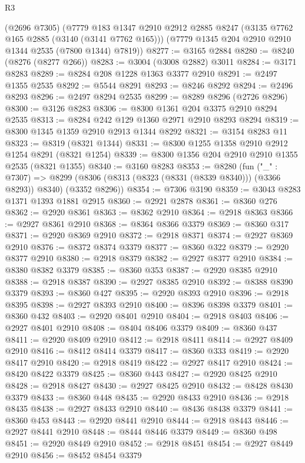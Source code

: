 \begin{lexlean}{R3}
\begin{coremodule}
    (@2696 @7305)
    (@7779
      @183
      @1347
      @2910
      @2912
      @2885
      @8247
      (@3135 @7762 @165 @2885 (@3140 (@3141 @7762 @165)))
      (@7779 @1345 @204 @2910 @2910 @1344 @2535 (@7800 @1344) @7819))
@8277 := @3165 @2884
@8280 := @8240 (@8276 (@8277 @266))
@8283 := @3004 (@3008 @2882) @3011
@8284 := @3171 @8283
@8289 := @8284 @208 @1228 @1363 @3377 @2910
@8291 := @2497 @1355 @2535
@8292 := @5544 @8291
@8293 := @8246 @8292
@8294 := @2496 @8293
@8296 := @2497 @8294 @2535
@8299 := @8289 @8296 (@2726 @8296)
@8300 := @3126 @8283
@8306 := @8300 @1361 @204 @3375 @2910 @8294 @2535
@8313 := @8284 @242 @129 @1360 @2971 @2910 @8293 @8294
@8319 := @8300 @1345 @1359 @2910 @2913 @1344 @8292
@8321 := @3154 @8283 @11
@8323 := @8319 (@8321 @1344)
@8331 := @8300 @1255 @1358 @2910 @2912 @1254 @8291 (@8321 @1254)
@8339 := @8300 @1356 @204 @2910 @2910 @1355 @2535 (@8321 @1355)
@8340 := @3160 @8283
@8353 := @8280
    (fun ("_" : @7307) =>
    @8299 (@8306 (@8313 (@8323 (@8331 (@8339 @8340))) (@3366 @8293)) @8340) (@3352 @8296))
@8354 := @7306 @3190
@8359 := @3043 @8283 @1371 @1393 @1881 @2915
@8360 := @2921 @2878
@8361 := @8360 @276
@8362 := @2920 @8361
@8363 := @8362 @2910
@8364 := @2918 @8363
@8366 := @2927 @8361 @2910
@8368 := @8364 @8366 @3379
@8369 := @8360 @317
@8371 := @2920 @8369 @2910
@8372 := @2918 @8371
@8374 := @2927 @8369 @2910
@8376 := @8372 @8374 @3379
@8377 := @8360 @322
@8379 := @2920 @8377 @2910
@8380 := @2918 @8379
@8382 := @2927 @8377 @2910
@8384 := @8380 @8382 @3379
@8385 := @8360 @353
@8387 := @2920 @8385 @2910
@8388 := @2918 @8387
@8390 := @2927 @8385 @2910
@8392 := @8388 @8390 @3379
@8393 := @8360 @427
@8395 := @2920 @8393 @2910
@8396 := @2918 @8395
@8398 := @2927 @8393 @2910
@8400 := @8396 @8398 @3379
@8401 := @8360 @432
@8403 := @2920 @8401 @2910
@8404 := @2918 @8403
@8406 := @2927 @8401 @2910
@8408 := @8404 @8406 @3379
@8409 := @8360 @437
@8411 := @2920 @8409 @2910
@8412 := @2918 @8411
@8414 := @2927 @8409 @2910
@8416 := @8412 @8414 @3379
@8417 := @8360 @333
@8419 := @2920 @8417 @2910
@8420 := @2918 @8419
@8422 := @2927 @8417 @2910
@8424 := @8420 @8422 @3379
@8425 := @8360 @443
@8427 := @2920 @8425 @2910
@8428 := @2918 @8427
@8430 := @2927 @8425 @2910
@8432 := @8428 @8430 @3379
@8433 := @8360 @448
@8435 := @2920 @8433 @2910
@8436 := @2918 @8435
@8438 := @2927 @8433 @2910
@8440 := @8436 @8438 @3379
@8441 := @8360 @453
@8443 := @2920 @8441 @2910
@8444 := @2918 @8443
@8446 := @2927 @8441 @2910
@8448 := @8444 @8446 @3379
@8449 := @8360 @498
@8451 := @2920 @8449 @2910
@8452 := @2918 @8451
@8454 := @2927 @8449 @2910
@8456 := @8452 @8454 @3379

\end{coremodule}
\end{lexlean}
